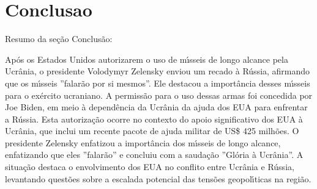 \documentclass[article,11pt,oneside,a4paper,brazil,sumario=tradicional]{abntex2}%
\begin{document}
%
\section{Conclusao}%
\label{sec:Conclusao}%
Resumo da se\c{c}\~ao Conclus\~ao:

Ap\'os os Estados Unidos autorizarem o uso de m{\'\i}sseis de longo alcance pela Ucr\^ania, o presidente Volodymyr Zelensky enviou um recado \`a R\'ussia, afirmando que os m{\'\i}sseis ''falar\~ao por si mesmos''. Ele destacou a import\^ancia desses m{\'\i}sseis para o ex\'ercito ucraniano. A permiss\~ao para o uso dessas armas foi concedida por Joe Biden, em meio \`a depend\^encia da Ucr\^ania da ajuda dos EUA para enfrentar a R\'ussia. Esta autoriza\c{c}\~ao ocorre no contexto do apoio significativo dos EUA \`a Ucr\^ania, que inclui um recente pacote de ajuda militar de US\$ 425 milh\~oes. O presidente Zelensky enfatizou a import\^ancia dos m{\'\i}sseis de longo alcance, enfatizando que eles ''falar\~ao'' e concluiu com a sauda\c{c}\~ao ''Gl\'oria \`a Ucr\^ania''. A situa\c{c}\~ao destaca o envolvimento dos EUA no conflito entre Ucr\^ania e R\'ussia, levantando quest\~oes sobre a escalada potencial das tens\~oes geopol{\'\i}ticas na regi\~ao.

%
%
\end{document}

